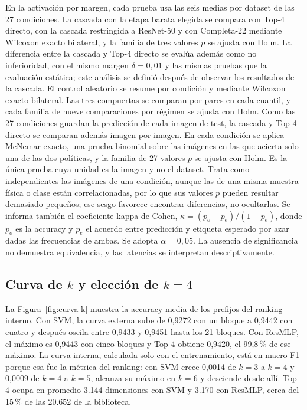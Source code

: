 \documentclass[a4paper,fleqn]{cas-sc}
\begin{document}
En la activación por margen, cada prueba usa las seis medias por dataset de las 27 condiciones. La cascada con la etapa barata elegida se compara con Top-4 directo, con la cascada restringida a ResNet-50 y con Completa-22 mediante Wilcoxon exacto bilateral, y la familia de tres valores $p$ se ajusta con Holm. La diferencia entre la cascada y Top-4 directo se evalúa además como no inferioridad, con el mismo margen $\delta=0{,}01$ y las mismas pruebas que la evaluación estática; este análisis se definió después de observar los resultados de la cascada. El control aleatorio se resume por condición y mediante Wilcoxon exacto bilateral. Las tres compuertas se comparan por pares en cada cuantil, y cada familia de nueve comparaciones por régimen se ajusta con Holm. Como las 27 condiciones guardan la predicción de cada imagen de test, la cascada y Top-4 directo se comparan además imagen por imagen. En cada condición se aplica McNemar exacto, una prueba binomial sobre las imágenes en las que acierta solo una de las dos políticas, y la familia de 27 valores $p$ se ajusta con Holm. Es la única prueba cuya unidad es la imagen y no el dataset. Trata como independientes las imágenes de una condición, aunque las de una misma muestra física o clase están correlacionadas, por lo que sus valores $p$ pueden resultar demasiado pequeños; ese sesgo favorece encontrar diferencias, no ocultarlas. Se informa también el coeficiente kappa de Cohen, $\kappa=(p_o-p_e)/(1-p_e)$, donde $p_o$ es la accuracy y $p_e$ el acuerdo entre predicción y etiqueta esperado por azar dadas las frecuencias de ambas. Se adopta $\alpha=0{,}05$. La ausencia de significancia no demuestra equivalencia, y las latencias se interpretan descriptivamente.

\subsection{Curva de $k$ y elección de $k=4$}\label{sec:curva-k}

La Figura~\ref{fig:curva-k} muestra la accuracy media de los prefijos del ranking interno. Con SVM, la curva externa sube de 0,9272 con un bloque a 0,9442 con cuatro y después oscila entre 0,9433 y 0,9451 hasta los 21 bloques. Con ResMLP, el máximo es 0,9443 con cinco bloques y Top-4 obtiene 0,9420, el 99,8\,\% de ese máximo. La curva interna, calculada solo con el entrenamiento, está en macro-F1 porque esa fue la métrica del ranking: con SVM crece 0,0014 de $k=3$ a $k=4$ y 0,0009 de $k=4$ a $k=5$, alcanza su máximo en $k=6$ y desciende desde allí. Top-4 ocupa en promedio 3.144 dimensiones con SVM y 3.170 con ResMLP, cerca del 15\,\% de las 20.652 de la biblioteca.
\end{document}
